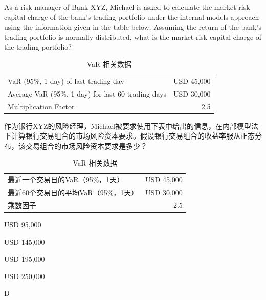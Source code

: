 \documentclass{article}
\newcounter{question} %
\begin{document}
\begin{question}
    As a risk manager of Bank XYZ, Michael is asked to calculate the market risk capital charge of the bank's trading portfolio under the internal models approach using the information given in the table below. Assuming the return of the bank's trading portfolio is normally distributed, what is the market risk capital charge of the trading portfolio?

    \begin{table}[htbp]
        \centering
        \begin{tabular}{l r}
            \hline
            VaR (95\%, 1-day) of last trading day                & USD 45,000 \\
            Average VaR (95\%, 1-day) for last 60 trading days   & USD 30,000 \\
            Multiplication Factor                                & 2.5 \\
            \hline
        \end{tabular}
        \caption{VaR 相关数据}
    \end{table}
    作为银行XYZ的风险经理，Michael被要求使用下表中给出的信息，在内部模型法下计算银行交易组合的市场风险资本要求。假设银行交易组合的收益率服从正态分布，该交易组合的市场风险资本要求是多少？

    \begin{table}[htbp]
        \centering
        \begin{tabular}{l r}
            \hline
            最近一个交易日的VaR（95\%，1天）                & USD 45,000 \\
            最近60个交易日的平均VaR（95\%，1天）   & USD 30,000 \\
            乘数因子                                & 2.5 \\
            \hline
        \end{tabular}
        \caption{VaR 相关数据}
    \end{table}
\end{question}

\begin{choices}
    \item USD 95,000
    \item USD 145,000
    \item USD 195,000
    \item USD 250,000
\end{choices}

\begin{correctanswer}
    D
\end{correctanswer}
\end{document}
